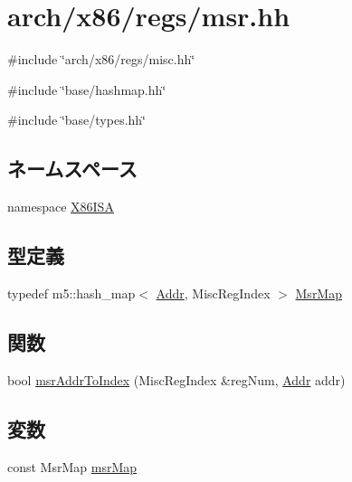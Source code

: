\hypertarget{msr_8hh}{
\section{arch/x86/regs/msr.hh}
\label{msr_8hh}
}
{\ttfamily \#include \char`\"{}arch/x86/regs/misc.hh\char`\"{}}\par
{\ttfamily \#include \char`\"{}base/hashmap.hh\char`\"{}}\par
{\ttfamily \#include \char`\"{}base/types.hh\char`\"{}}\par
\subsection*{ネームスペース}
\begin{DoxyCompactItemize}
\item 
namespace \hyperlink{namespaceX86ISA}{X86ISA}
\end{DoxyCompactItemize}
\subsection*{型定義}
\begin{DoxyCompactItemize}
\item 
typedef m5::hash\_\-map$<$ \hyperlink{base_2types_8hh_af1bb03d6a4ee096394a6749f0a169232}{Addr}, MiscRegIndex $>$ \hyperlink{namespaceX86ISA_afe7406830ac3c2d1d425e6b2f8985b0e}{MsrMap}
\end{DoxyCompactItemize}
\subsection*{関数}
\begin{DoxyCompactItemize}
\item 
bool \hyperlink{namespaceX86ISA_a700421607b87243921222a0b4183eef3}{msrAddrToIndex} (MiscRegIndex \&regNum, \hyperlink{base_2types_8hh_af1bb03d6a4ee096394a6749f0a169232}{Addr} addr)
\end{DoxyCompactItemize}
\subsection*{変数}
\begin{DoxyCompactItemize}
\item 
const MsrMap \hyperlink{namespaceX86ISA_a668a095a9f8f9c629c5b12ff0bb8a721}{msrMap}
\end{DoxyCompactItemize}
